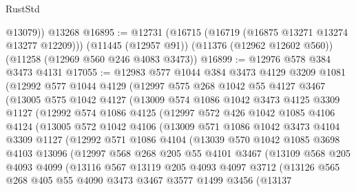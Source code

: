 \begin{lexlean}{RustStd}
\begin{coremodule}
{\begin{coremodule}
{{{{{{{{{{{{{{{{{{{{{{{{{{{{{{{{{{{{{{{{{{{{{{{{{{{{{{{{{{{{{{{{{{{{{{{{{{{{{{{{{{{{{        @13079))
    @13268
@16895 := @12731
    (@16715 (@16719 (@16875 @13271 @13274 @13277 @12209)))
    (@11445 (@12957 @91))
    (@11376 (@12962 @12602 @560))
    (@11258 (@12969 @560 @246 @4083 @3473))
@16899 := @12976 @578 @384 @3473 @4131
@17055 := @12983
    @577
    @1044
    @384
    @3473
    @4129
    @3209
    @1081
    (@12992
      @577
      @1044
      @4129
      (@12997
        @575
        @268
        @1042
        @55
        @4127
        @3467
        (@13005
          @575
          @1042
          @4127
          (@13009
            @574
            @1086
            @1042
            @3473
            @4125
            @3309
            @1127
            (@12992
              @574
              @1086
              @4125
              (@12997
                @572
                @426
                @1042
                @1085
                @4106
                @4124
                (@13005
                  @572
                  @1042
                  @4106
                  (@13009
                    @571
                    @1086
                    @1042
                    @3473
                    @4104
                    @3309
                    @1127
                    (@12992
                      @571
                      @1086
                      @4104
                      (@13039
                        @570
                        @1042
                        @1085
                        @3698
                        @4103
                        @13096
                        (@12997
                          @568
                          @268
                          @205
                          @55
                          @4101
                          @3467
                          (@13109
                            @568
                            @205
                            @4093
                            @4099
                            (@13116
                              @567
                              @13119
                              @205
                              @4093
                              @4097
                              @3712
                              (@13126
                                @565
                                @268
                                @405
                                @55
                                @4090
                                @3473
                                @3467
                                @3577
                                @1499
                                @3456
                                (@13137
}}}}}}}}}}}}}}}}}}}}}}}}}}}}}}}}}}}}}}}}}}}}}}}}}}}}}}}}}}}}}}}}}}}}}}}}}}}}}}}}}}}}}
\end{coremodule}}
\end{coremodule}
\end{lexlean}
